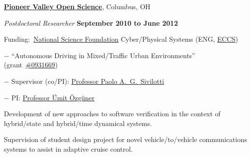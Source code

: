 \documentclass[10pt]{article}
\newcommand{\halfblankline}{\quad\vspace{-0.5\baselineskip}\pagebreak[3]}
\begin{document}
\href{http://www.osu.edu/}{\textbf{Pioneer Valley Open Science}},
Columbus, OH
\begin{outerlist}

    \item[] \textit{Postdoctoral Researcher}%
            \hfill \textbf{September 2010 to June 2012}
            \begin{innerlist}
                \item Funding:~\href{http://www.nfs.gov/}{National Science Foundation} Cyber\-/Physical Systems (ENG, \href{http://www.nsf.gov/div/index.jsp?div=eccs}{ECCS})
                \begin{innerlist}
                    \item[$-$] ``Autonomous Driving in Mixed\-/Traffic Urban Environments''
                        (grant~\href{http://www.nsf.gov/awardsearch/showAward.do?AwardNumber=0931669}{\#0931669})
                    \item[$-$] Supervisor (co\-/PI):
                        \href{http://www.cse.ohio-state.edu/~paolo/}%
                             {Professor Paolo A.~G.~Sivilotti}
                    \item[$-$] PI:
                        \href{http://www.ece.ohio-state.edu/~umit/}%
                             {Professor \"{U}mit \"{O}zg\"{u}ner}
                \end{innerlist}

                \item Development of new approaches to software
                    verification in the context of hybrid\-/state and
                    hybrid\-/time dynamical systems.

                \item Supervision of student design project for
                    novel vehicle\-/to\-/vehicle communications
                    systems to assist in adaptive cruise control.
            \end{innerlist}

\end{outerlist}

\halfblankline
\end{document}
